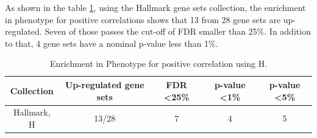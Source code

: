 As shown in the table \ref{enr_ph_positive_h}, using the Hallmark gene sets collection, the enrichment in phenotype for positive correlations shows that 13 from 28 gene sets are up-regulated. Seven of those passes the cut-off of FDR smaller than 25\%. In addition to that, 4 gene sets have a nominal p-value less than 1\%. 


\begin{table}[h!]
    \centering
    \begin{tabular}{ccccc}
    \hline
    Collection      & Up-regulated gene sets & FDR \textless 25\% & p-value \textless 1\% & p-value \textless 5\% \\ \hline
    Hallmark, H     & 13/28                  & 7                                 & 4                                    & 5                                    \\ \hline
    \end{tabular}
    \caption{Enrichment in Phenotype for positive correlation using H.}
    \label{enr_ph_positive_h}
    \end{table}

